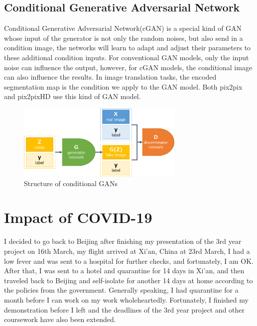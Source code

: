 \subsection{Conditional Generative Adversarial Network}
Conditional Generative Adversarial Network(cGAN) is a special kind of GAN whose input 
of the generator is not only the random noises, but also send in a condition image, the networks will learn 
to adapt and adjust their parameters to these additional condition inputs. For conventional GAN models, 
only the input noise can influence the output, however, for cGAN models, the conditional image can 
also influence the results. In image translation tasks, the encoded segmentation map is the condition 
we apply to the GAN model. Both pix2pix\cite{pix2pix2016} and pix2pixHD\cite{wang2018pix2pixHD} use 
this kind of GAN model.
\begin{figure}[H]
    \begin{center}
    \includegraphics[width=8cm]{figures/cGANs}
    \end{center}
    \caption{Structure of conditional GANs}
    \label{fig:cGANs-structure}
\end{figure}

\section{Impact of COVID-19}
I decided to go back to Beijing after finishing my presentation of the 3rd year project on 16th March, 
my flight arrived at Xi'an, China at 23rd March, 
I had a low fever and was sent to a hospital for further checks, and fortunately, I am OK. 
After that, I was sent to a hotel and quarantine for 14 days in Xi'an, and then traveled back to Beijing and 
self-isolate for another 14 days at home according to the policies from the government. Generally speaking, I 
had quarantine for a month before I can work on my work wholeheartedly. Fortunately, I finished my demonstration 
before I left and the deadlines of the 3rd year project and other coursework have also been extended.



